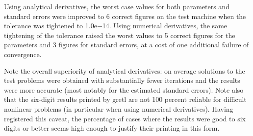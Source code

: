   Using analytical derivatives, the worst case values for both
  parameters and standard errors were improved to 6 correct figures on
  the test machine when the tolerance was tightened to 1.0e$-$14.
  Using numerical derivatives, the same tightening of the tolerance
  raised the worst values to 5 correct figures for the parameters and
  3 figures for standard errors, at a cost of one additional failure
  of convergence.

  Note the overall superiority of analytical derivatives: on average
  solutions to the test problems were obtained with substantially
  fewer iterations and the results were more accurate (most notably
  for the estimated standard errors).  Note also that the six-digit
  results printed by gretl are not 100 percent reliable for
  difficult nonlinear problems (in particular when using numerical
  derivatives).  Having registered this caveat, the percentage of
  cases where the results were good to six digits or better seems high
  enough to justify their printing in this form.

